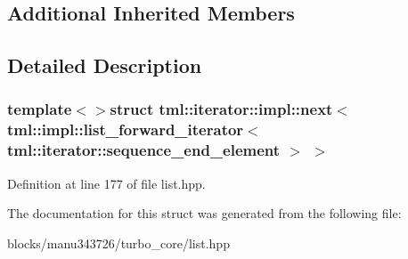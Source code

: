 \subsection*{Additional Inherited Members}


\subsection{Detailed Description}
\subsubsection*{template$<$$>$struct tml\+::iterator\+::impl\+::next$<$ tml\+::impl\+::list\+\_\+forward\+\_\+iterator$<$ tml\+::iterator\+::sequence\+\_\+end\+\_\+element $>$ $>$}



Definition at line 177 of file list.\+hpp.



The documentation for this struct was generated from the following file\+:\begin{DoxyCompactItemize}
\item 
blocks/manu343726/turbo\+\_\+core/list.\+hpp\end{DoxyCompactItemize}
